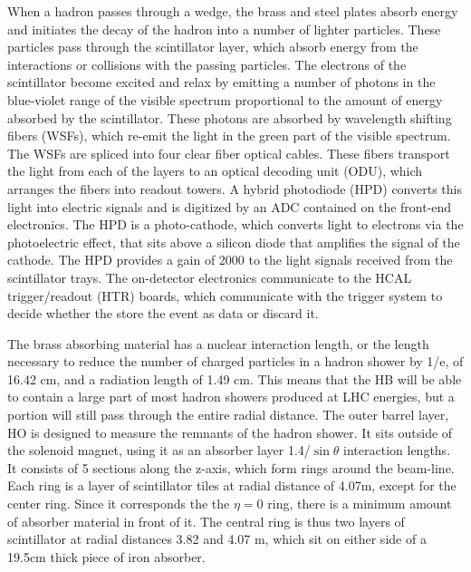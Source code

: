 \par When a hadron passes through a wedge, the brass and steel plates
absorb energy and initiates the decay of the hadron into a number of
lighter particles.  These particles pass through the scintillator
layer, which absorb energy from the interactions or collisions with
the passing particles.  The electrons of the scintillator become
excited and relax by emitting a number of photons in the blue-violet
range of the visible spectrum proportional to the amount of energy
absorbed by the scintillator.   These photons are absorbed by
wavelength shifting fibers (WSFs), which re-emit the light in the
green part of the visible spectrum.  The WSFs are spliced into 
four clear fiber optical cables.  These fibers transport the light
from each of the layers to an optical decoding unit (ODU), which
arranges the fibers into readout towers.  A hybrid photodiode (HPD)
converts this light into electric signals and is digitized by an ADC
contained on the front-end electronics.  The HPD is a photo-cathode,
which converts light to electrons via the photoelectric effect, that
sits above a silicon diode that amplifies the signal of the cathode.
The HPD provides a gain of 2000 to the light signals received from the
scintillator trays.  The on-detector electronics communicate to the
HCAL trigger/readout (HTR) boards, which communicate with the trigger
system to decide whether the store the event as data or discard it.  

\par  The brass absorbing material has a nuclear interaction length,
or the length necessary to reduce the number of charged particles in a
hadron shower by 1/e, of 16.42 cm, and a radiation length of 1.49 cm.
This means that the HB will be able to contain a large part of most
hadron showers produced at LHC energies, but a portion will still pass
through the entire radial distance.  The outer barrel layer, HO is
designed to measure the remnants of the hadron shower.  It sits outside
of the solenoid magnet, using it as an absorber layer
1.4/$\sin{\theta}$ interaction lengths.  It consists of 5 sections
along the z-axis, which form rings around the beam-line.  Each ring is
a layer of scintillator tiles at radial distance of 4.07m, except for
the center ring.  Since it corresponds the the $\eta=0$ ring, there is
a minimum amount of absorber material in front of it.  The central
ring is thus two layers of scintillator at radial distances 3.82 and
4.07 m, which sit on either side of a 19.5cm thick piece of iron
absorber.  

